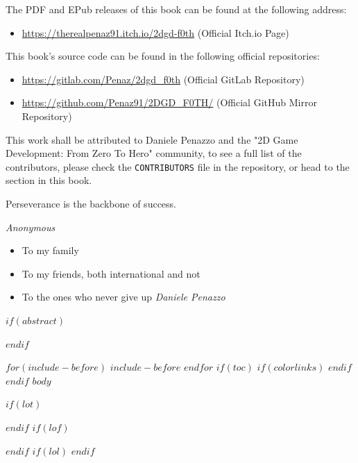 \documentclass{article}
\begin{document}
The PDF and EPub releases of this book can be found at the following address:
\begin{itemize}
    \item \url{https://therealpenaz91.itch.io/2dgd-f0th} (Official Itch.io Page)
\end{itemize}

This book's source code can be found in the following official repositories:

\begin{itemize}
    \item \url{https://gitlab.com/Penaz/2dgd_f0th} (Official GitLab Repository)
    \item \url{https://github.com/Penaz91/2DGD_F0TH/} (Official GitHub Mirror Repository)
\end{itemize}

\vspace{24pt}

This work shall be attributed to Daniele Penazzo and the "2D Game Development: From Zero To Hero" community, to see a full list of the contributors, please check the \texttt{CONTRIBUTORS} file in the repository, or head to the  section in this book.

\clearpage

\clearpage
\null
\vfill
\begin{minipage}[b]{\textwidth}
\epigraph{Perseverance is the backbone of success.}{\textit{Anonymous}}
\addvspace{200 pt}
\begin{itemize}[label={}]
    \item To my family
    \item To my friends, both international and not
    \item To the ones who never give up
    \textit{Daniele Penazzo}
\end{itemize}
\end{minipage}
\vfill
\cleardoublepage
\pagestyle{fancy}
\normalsize
$if(abstract)$
\begin{abstract}
$abstract$
\end{abstract}
$endif$

$for(include-before)$
$include-before$
$endfor$
$if(toc)$
{
$if(colorlinks)$
\hypersetup{linkcolor=$if(toccolor)$$toccolor$$else$black$endif$}
$endif$
\clearpage
\pagestyle{empty}
\null\clearpage
\pagestyle{fancy}
\tableofcontents
\clearpage
}
$endif$
\clearpage
{}
$body$

\clearpage
{}
$if(lot)$
\listoftables
$endif$
$if(lof)$
\listoffigures
$endif$
$if(lol)$
\lstlistoflistings
$endif$
\end{document}
